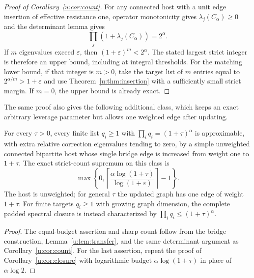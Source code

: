 \begin{proof}[Proof of Corollary~\ref{u:cor:count}]
For any connected host with a unit edge insertion of effective
resistance one, operator monotonicity gives $\lambda_j(C_\alpha)\ge0$
and the determinant lemma gives
\[
 \prod_j(1+\lambda_j(C_\alpha))=2^\alpha.
\]
If $m$ eigenvalues exceed $\varepsilon$, then
$(1+\varepsilon)^m<2^\alpha$. The stated largest strict integer is
therefore an upper bound, including at integral thresholds.
For the matching lower bound, if that integer is $m>0$, take the
target list of $m$ entries equal to $2^{\alpha/m}>1+\varepsilon$
and use Theorem~\ref{u:thm:insertion} with a sufficiently small strict
margin. If $m=0$, the upper bound is already exact.
\end{proof}


The same proof also gives the following additional class, which keeps
an exact arbitrary leverage parameter but allows one weighted edge
after updating.
\begin{corollary}\label{u:cor:bridge}
For every $\tau>0$, every finite list $q_i\ge1$ with
$\prod_iq_i=(1+\tau)^\alpha$ is approximable, with extra relative
correction eigenvalues tending to zero, by a simple unweighted
connected bipartite host whose single bridge edge is increased from
weight one to $1+\tau$.
The exact strict-count supremum on this class is
\[
 \max\left\{0,\left\lceil
    \frac{\alpha\log(1+\tau)}{\log(1+\varepsilon)}
                           \right\rceil-1\right\}.
\]
The host is unweighted; for general $\tau$ the updated graph has one
edge of weight $1+\tau$.
For finite targets $q_i\ge1$ with growing graph dimension, the complete
padded spectral closure is instead characterized by
$\prod_i q_i\le(1+\tau)^\alpha$.
\end{corollary}
\begin{proof}
The equal-budget assertion and sharp count follow from the bridge
construction, Lemma~\ref{u:lem:transfer}, and the same determinant
argument as Corollary~\ref{u:cor:count}.
For the last assertion, repeat the proof of Corollary~\ref{u:cor:closure}
with logarithmic budget $\alpha\log(1+\tau)$ in place of
$\alpha\log2$.
\end{proof}

